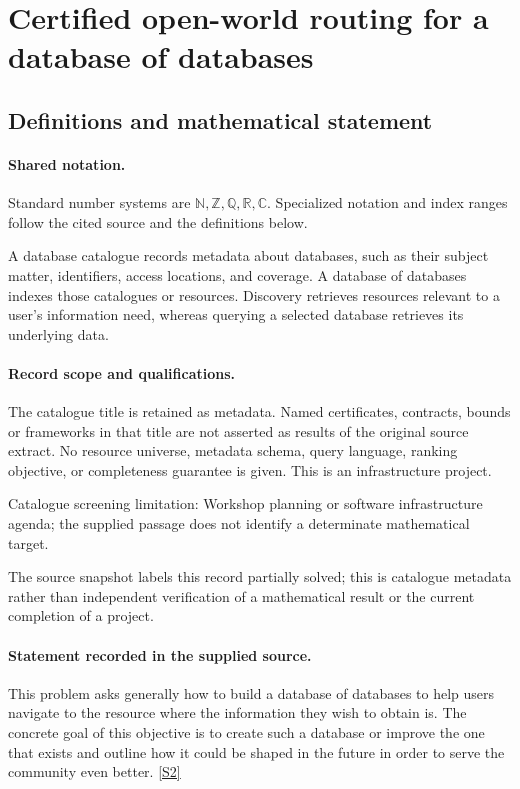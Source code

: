 \documentclass[11pt]{article}
\newcommand{\sref}[2]{\hyperlink{source:#1:#2}{[S#2]}}
\begin{document}
\section{Certified open-world routing for a database of databases}\label{statement}

\subsection{Definitions and mathematical statement}

\paragraph{Shared notation.}Standard number systems are $\mathbb N,\mathbb Z,\mathbb Q,\mathbb R,\mathbb C$. Specialized notation and index ranges follow the cited source and the definitions below.


A database catalogue records metadata about databases, such as their subject matter, identifiers, access locations, and coverage. A database of databases indexes those catalogues or resources. Discovery retrieves resources relevant to a user's information need, whereas querying a selected database retrieves its underlying data.
\paragraph{Record scope and qualifications.}
The catalogue title is retained as metadata. Named certificates, contracts, bounds or frameworks in that title are not asserted as results of the original source extract.
No resource universe, metadata schema, query language, ranking objective, or completeness guarantee is given. This is an infrastructure project.

Catalogue screening limitation: Workshop planning or software infrastructure agenda; the supplied passage does not identify a determinate mathematical target.

The source snapshot labels this record partially solved; this is catalogue metadata rather than independent verification of a mathematical result or the current completion of a project.
\paragraph{Statement recorded in the supplied source.}
This problem asks generally how to build a database of databases to help users navigate to the resource where the information they wish to obtain is.
The concrete goal of this objective is to create such a database or improve the one that exists and outline how it could be shaped in the future in order to serve the community even better. \sref{statement}{2}
\end{document}
